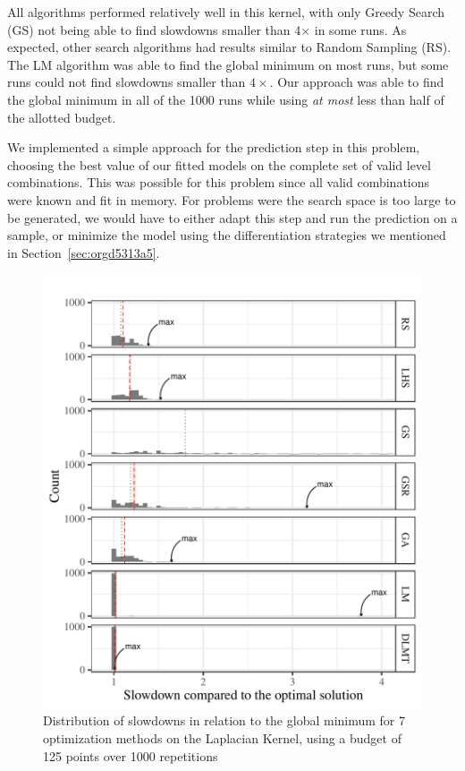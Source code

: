 \documentclass[conference]{IEEEtran}
\begin{document}
All algorithms performed relatively well in this kernel, with only Greedy Search
(GS) not being able to find slowdowns smaller than 4\(\times\) in some runs. As
expected, other search algorithms had results similar to Random Sampling (RS).
The LM algorithm was able to find the global minimum on most runs, but some runs
could not find slowdowns smaller than \(4\times\). Our approach was able to find
the global minimum in all of the 1000 runs while using \emph{at most} less than half
of the allotted budget.

We implemented a simple approach for the prediction step in this problem,
choosing the best value of our fitted models on the complete set of valid level
combinations. This was possible for this problem since all valid combinations
were known and fit in memory. For problems were the search space is too large to
be generated, we would have to either adapt this step and run the prediction on
a sample, or minimize the model using the differentiation strategies we mentioned
in Section~\ref{sec:orgd5313a5}.

\begin{figure}[t]\vspace{-.5cm}
\centering
\includegraphics[width=.9\columnwidth]{./img/comparison_histogram.pdf}
\caption{\label{fig:org6b708de}
Distribution of slowdowns in relation to the global minimum for 7 optimization methods on the Laplacian Kernel, using a budget of 125 points over 1000 repetitions \vspace{-.5cm}}
\end{figure}
\end{document}
